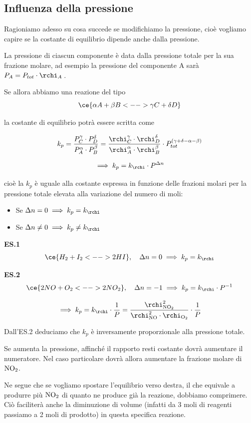 
\subsection{Influenza della pressione}
Ragioniamo adesso su cosa succede se modifichiamo la pressione, cioè vogliamo capire se la costante di equilibrio dipende anche dalla pressione.

La pressione di ciascun componente è data dalla pressione totale per la sua frazione molare, ad esempio la pressione del componente A sarà $P_A = P_{tot} \cdot \rchi_A$\,.

Se allora abbiamo una reazione del tipo
$$\ce{\alpha A + \beta B <--> \gamma C + \delta D}$$

la costante di equilibrio potrà essere scritta come

$$k_p = \frac{P_C^{\gamma} \cdot P_D^{\delta}}{P_A^{\alpha} \cdot P_B^{\beta}} = \frac{\rchi_C^{\gamma} \cdot \rchi_D^{\delta}}{\rchi_A^{\alpha} \cdot \rchi_B^{\beta}} \cdot P_{tot}^{(\gamma + \delta - \alpha - \beta)}$$

$$\implies k_p = k_{\rchi} \cdot P^{\Delta n}$$

cioè la $k_p$ è uguale alla costante espressa in funzione delle frazioni molari per la pressione totale elevata alla variazione del numero di moli:

\begin{itemize}
    \item Se $\Delta n = 0 \implies k_p = k_{\rchi}$
    \item Se $\Delta n \neq 0 \implies k_p \neq k_{\rchi}$
\end{itemize}

\vspace{0.2cm}\textbf{ES.1}
$$\ce{H_2 + I_2 <--> 2HI}, \quad \Delta n = 0 \implies k_p = k_{\rchi}$$

\textbf{ES.2}
$$\ce{2NO + O_2 <--> 2NO_2}, \quad \Delta n = -1 \implies k_p = k_{\rchi} \cdot P^{-1}$$

$$\implies k_p = k_{\rchi} \cdot \frac{1}{P}= \frac{\rchi_{\text{NO}_2}^2}{\rchi_{\text{NO}}^2 \cdot \rchi_{\text{O}_2}} \cdot \frac{1}{P}$$

Dall'ES.2 deduciamo che $k_p$ è inversamente proporzionale alla pressione totale.

Se aumenta la pressione, affinché il rapporto resti costante dovrà aumentare il numeratore. Nel caso particolare dovrà allora aumentare la frazione molare di $\rm NO_2$.

Ne segue che se vogliamo spostare l'equilibrio verso destra, il che equivale a produrre più $\rm NO_2$ di quanto ne produce già la reazione, dobbiamo comprimere. Ciò faciliterà anche la diminuzione di volume (infatti da 3 moli di reagenti passiamo a 2 moli di prodotto) in questa specifica reazione.

